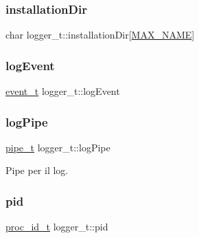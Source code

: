 \subsubsection{\texorpdfstring{installation\+Dir}{installationDir}}
{\footnotesize\ttfamily char logger\+\_\+t\+::installation\+Dir\mbox{[}\hyperlink{datatypes_8h_ac7c0207aa5a0e10d378be03b68041350}{M\+A\+X\+\_\+\+N\+A\+ME}\mbox{]}}

\mbox{\label{structlogger__t_a5305675a78acc22524aff8c7351904d7}} 
\subsubsection{\texorpdfstring{log\+Event}{logEvent}}
{\footnotesize\ttfamily \hyperlink{datatypes_8h_aaf06dbc1f07c15cb5e2779d3ec2dcb4b}{event\+\_\+t} logger\+\_\+t\+::log\+Event}

\mbox{\label{structlogger__t_a16890b7add5181dde0138ea916a8222c}} 
\subsubsection{\texorpdfstring{log\+Pipe}{logPipe}}
{\footnotesize\ttfamily \hyperlink{datatypes_8h_ad37b29694b7e5ee41ea19673078dc995}{pipe\+\_\+t} logger\+\_\+t\+::log\+Pipe}



Pipe per il log. 

\mbox{\label{structlogger__t_a06d3329d87f49d3b73f7a805cfe5b61c}} 
\subsubsection{\texorpdfstring{pid}{pid}}
{\footnotesize\ttfamily \hyperlink{datatypes_8h_a03c58ad8bfbf8e14928e8f58a5f23f2e}{proc\+\_\+id\+\_\+t} logger\+\_\+t\+::pid}

\mbox{\label{structlogger__t_a573677c90c0100b6ad3697214016caf3}} 
